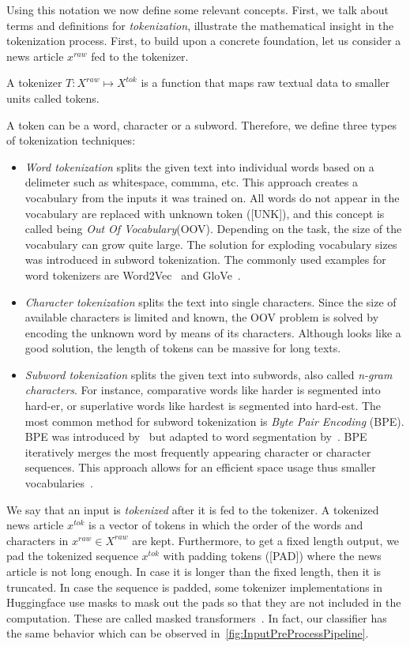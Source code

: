 Using this notation we now define some relevant concepts. First, we talk about terms and definitions for \emph{tokenization}, illustrate the mathematical insight in the tokenization process. First, to build upon a concrete foundation, let us consider a news article $x^{raw}$ fed to the tokenizer.
\begin{definition}
    A tokenizer $T:X^{raw} \mapsto X^{tok}$ is a function that maps raw textual data to smaller units called tokens.
\end{definition}
A token can be a word, character or a subword. Therefore, we define three types of tokenization techniques:
\begin{itemize}
    \item \emph{Word tokenization} splits the given text into individual words based on a delimeter such as whitespace, commma, etc. This approach creates a vocabulary from the inputs it was trained on. All words do not appear in the vocabulary are replaced with unknown token ([UNK]), and this concept is called being \emph{Out Of Vocabulary}(OOV). Depending on the task, the size of the vocabulary can grow quite large. The solution for exploding vocabulary sizes was introduced in subword tokenization. The commonly used examples for word tokenizers are Word2Vec~\parencite{Word2Vec_Mikolov} and GloVe~\parencite{GloVe_Pennington}.
    \item \emph{Character tokenization} splits the text into single characters. Since the size of available characters is limited and known, the OOV problem is solved by encoding the unknown word by means of its characters. Although looks like a good solution, the length of tokens can be massive for long texts.
    \item \emph{Subword tokenization} splits the given text into subwords, also called \emph{n-gram characters}. For instance, comparative words like harder is segmented into hard-er, or superlative words like hardest is segmented into hard-est. The most common method for subword tokenization is \emph{Byte Pair Encoding} (BPE). BPE was introduced by~\cite{ANewAlgorithmForDataCompression_Gage} but adapted to word segmentation by~\cite{NeuralMachineTranslationOfRareWords_Sennrich}. BPE iteratively merges the most frequently appearing character or character sequences. This approach allows for an efficient space usage thus smaller vocabularies~\parencite{NeuralMachineTranslationOfRareWords_Sennrich}.
\end{itemize}
We say that an input is \emph{tokenized} after it is fed to the tokenizer. A tokenized news article $x^{tok}$ is a vector of tokens in which the order of the words and characters in $x^{raw} \in X^{raw}$ are kept. Furthermore, to get a fixed length output, we pad the tokenized sequence $x^{tok}$ with padding tokens ([PAD]) where the news article is not long enough. In case it is longer than the fixed length, then it is truncated. In case the sequence is padded, some tokenizer implementations in Huggingface use masks to mask out the pads so that they are not included in the computation. These are called masked transformers~\parencite{Transformers_Wolf}. In fact, our classifier has the same behavior which can be observed in~\ref{fig:InputPreProcessPipeline}.
